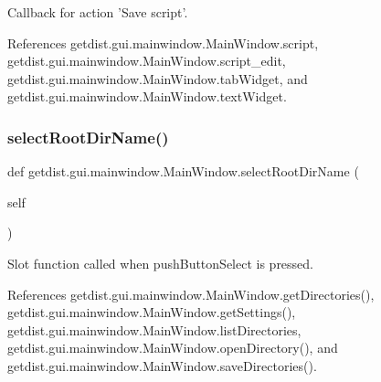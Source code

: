\begin{DoxyVerb}Callback for action 'Save script'.
\end{DoxyVerb}
 

References getdist.\+gui.\+mainwindow.\+Main\+Window.\+script, getdist.\+gui.\+mainwindow.\+Main\+Window.\+script\+\_\+edit, getdist.\+gui.\+mainwindow.\+Main\+Window.\+tab\+Widget, and getdist.\+gui.\+mainwindow.\+Main\+Window.\+text\+Widget.

\mbox{\label{classgetdist_1_1gui_1_1mainwindow_1_1MainWindow_a1f82d42630833ea1995e22bc60148d27}} 
\subsubsection{\texorpdfstring{select\+Root\+Dir\+Name()}{selectRootDirName()}}
{\footnotesize\ttfamily def getdist.\+gui.\+mainwindow.\+Main\+Window.\+select\+Root\+Dir\+Name (\begin{DoxyParamCaption}\item[{}]{self }\end{DoxyParamCaption})}

\begin{DoxyVerb}Slot function called when pushButtonSelect is pressed.
\end{DoxyVerb}
 

References getdist.\+gui.\+mainwindow.\+Main\+Window.\+get\+Directories(), getdist.\+gui.\+mainwindow.\+Main\+Window.\+get\+Settings(), getdist.\+gui.\+mainwindow.\+Main\+Window.\+list\+Directories, getdist.\+gui.\+mainwindow.\+Main\+Window.\+open\+Directory(), and getdist.\+gui.\+mainwindow.\+Main\+Window.\+save\+Directories().

